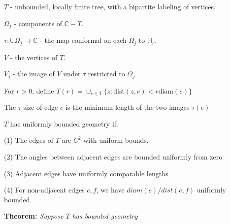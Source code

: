 \documentclass{beamer}
\begin{document}
\begin{frame}

{\tiny $T$ - unbounded, locally finite tree, with a bipartite labeling of vertices.

$\Omega_j$ - components of $\mathbb{C}-T$.

$\tau: \cup \Omega_j \rightarrow \mathbb{C}$ - the map conformal on each $\Omega_j$ to $\mathbb{H}_r$.

$V$ - the vertices of $T$. 

$V_j$ - the image of $V$ under $\tau$ restricted to $\Omega_j$.

For $r > 0$, define $T(r) = \cup_{e\in T} \{z : \textrm{dist}(z,e) < r\textrm{diam}(e) \}$

The $\tau$-size of edge $e$ is the minimum length of the two images $\tau(e)$

\vspace{2.5mm}

$T$ has uniformly bounded geometry if: 

\hspace{5mm} (1) The edges of $T$ are $C^2$ with uniform bounds. 

\hspace{5mm} (2) The angles between adjacent edges are bounded uniformly from zero

\hspace{5mm} (3) Adjacent edges have uniformly comparable lengths

\hspace{5mm} (4) For non-adjacent edges $e, f$, we have $diam(e)/dist(e,f)$ uniformly bounded. 

 }

\vspace{5mm}

{\bf Theorem:} {\it  Suppose $T$ has bounded geometry  }  

\end{frame}
\end{document}
